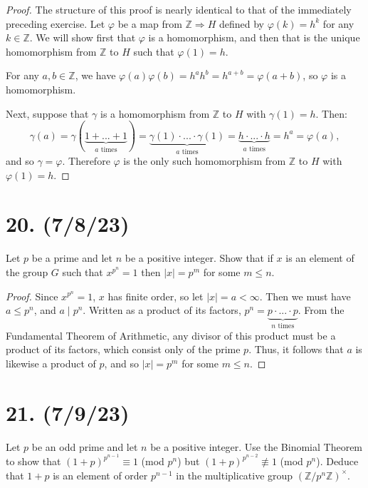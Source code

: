 \documentclass{article}
\begin{document}
\begin{proof}
    The structure of this proof is nearly identical to that of the immediately preceding exercise. Let $\varphi$ be a map from $\mathbb{Z} \Rightarrow H$ defined by $\varphi(k) = h^k$ for any $k \in \mathbb{Z}$. We will show first that $\varphi$ is a homomorphism, and then that is the unique homomorphism from $\mathbb{Z}$ to $H$ such that $\varphi(1) = h$.

    For any $a, b \in \mathbb{Z}$, we have $\varphi(a)\varphi(b) = h^a h^b = h^{a + b} = \varphi(a + b)$, so $\varphi$ is a homomorphism.

    Next, suppose that $\gamma$ is a homomorphism from $\mathbb{Z}$ to $H$ with $\gamma(1) = h$. Then:
    \begin{equation*}
        \gamma(a) = \gamma(\underbrace{1 + ... + 1}_{\text{$a$ times}}) = \underbrace{\gamma(1) \cdot ... \cdot \gamma(1)}_{\text{$a$ times}} = \underbrace{h \cdot ... \cdot h}_{\text{$a$ times}} = h^a = \varphi(a),
    \end{equation*}
    and so $\gamma = \varphi$. Therefore $\varphi$ is the only such homomorphism from $\mathbb{Z}$ to $H$ with $\varphi(1) = h$.
\end{proof}

\section*{20. (7/8/23)}

Let $p$ be a prime and let $n$ be a positive integer. Show that if $x$ is an element of the group $G$ such that $x^{p^n} = 1$ then $|x| = p^m$ for some $m \leq n$.

\begin{proof}
    Since $x^{p^n} = 1$, $x$ has finite order, so let $|x| = a < \infty$. Then we must have $a \leq p^n$, and $a \mid p^n$. Written as a product of its factors, $p^n = \underbrace{p \cdot ... \cdot p}_{\text{$n$ times}}$. From the Fundamental Theorem of Arithmetic, any divisor of this product must be a product of its factors, which consist only of the prime $p$. Thus, it follows that $a$ is likewise a product of $p$, and so $|x| = p^m$ for some $m \leq n$.
\end{proof}

\section*{21. (7/9/23)}

Let $p$ be an odd prime and let $n$ be a positive integer. Use the Binomial Theorem to show that $(1 + p)^{p^{n - 1}} \equiv 1$ (mod $p^n$) but $(1 + p)^{p^{n - 2}} \not\equiv 1$ (mod $p^n$). Deduce that $1 + p$ is an element of order $p^{n - 1}$ in the multiplicative group $(\mathbb{Z}/p^n \mathbb{Z})^\times$.
\end{document}
